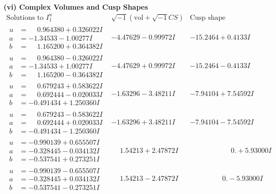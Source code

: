 \documentclass[1p]{elsarticle_modified}
\theoremstyle{definition}
\newcommand{\I}{\sqrt{-1}}
\begin{document}
\newpage\flushleft \textbf{(vi) Complex Volumes and Cusp Shapes}
$$\begin{array}{c|c|c}  
\text{Solutions to }I^u_{1}& \I (\text{vol} + \sqrt{-1}CS) & \text{Cusp shape}\\
 \hline 
\begin{aligned}
u &= \phantom{-}0.964380 + 0.326022 I \\
a &= -1.34533 - 1.00277 I \\
b &= \phantom{-}1.165200 + 0.364382 I\end{aligned}
 & -4.47629 - 0.99972 I & -15.2464 + 0.4133 I \\ \hline\begin{aligned}
u &= \phantom{-}0.964380 - 0.326022 I \\
a &= -1.34533 + 1.00277 I \\
b &= \phantom{-}1.165200 - 0.364382 I\end{aligned}
 & -4.47629 + 0.99972 I & -15.2464 - 0.4133 I \\ \hline\begin{aligned}
u &= \phantom{-}0.679243 + 0.583622 I \\
a &= \phantom{-}0.692444 - 0.020033 I \\
b &= -0.491434 + 1.250360 I\end{aligned}
 & -1.63296 - 3.48211 I & -7.94104 + 7.54592 I \\ \hline\begin{aligned}
u &= \phantom{-}0.679243 - 0.583622 I \\
a &= \phantom{-}0.692444 + 0.020033 I \\
b &= -0.491434 - 1.250360 I\end{aligned}
 & -1.63296 + 3.48211 I & -7.94104 - 7.54592 I \\ \hline\begin{aligned}
u &= -0.990139 + 0.655507 I \\
a &= -0.328445 - 0.034132 I \\
b &= -0.537541 + 0.273251 I\end{aligned}
 & \phantom{-}1.54213 + 2.47872 I & \phantom{-0.000000 -}0. + 5.93000 I \\ \hline\begin{aligned}
u &= -0.990139 - 0.655507 I \\
a &= -0.328445 + 0.034132 I \\
b &= -0.537541 - 0.273251 I\end{aligned}
 & \phantom{-}1.54213 - 2.47872 I & \phantom{-0.000000 } 0. - 5.93000 I \\ \hline\begin{aligned}

\end{aligned}
\end{array}$$
\end{document}
